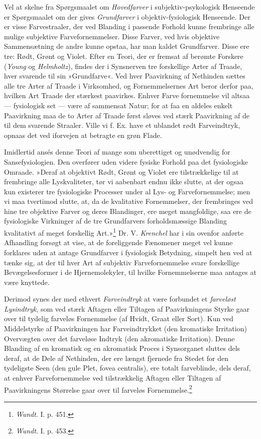 \documentclass[12pt,a4paper,openany]{book}
\newcommand{\opage}[1]{\marginnote{\footnotesize\textit{[#1]}}}
\begin{document}
Vel at skelne fra Spørgsmaalet om \emph{Hovedfarver} i
subjektiv-psykologisk Henseende er Spørgsmaalet om der gives
\emph{Grundfarver} i objektiv-fysiologisk Henseende. Der er visse
Farvestraaler, der ved Blanding i passende Forhold kunne frembringe alle
mulige subjektive Farvefornemmelser. Disse Farver, ved hvis objektive
Sammensætning de andre kunne opstaa, har man kaldet Grundfarver. Disse
ere tre: Rødt, Grønt og Violet. Efter en Teori, der er fremsat af
berømte Forskere (\emph{Young} og \emph{Helmholtz}), findes der i
Synsnerven tre forskellige Arter af Traade, hver svarende til sin
»Grundfarve«. Ved hver Paavirkning af Nethinden sættes alle tre
\opage{124}Arter af Traade i Virksomhed, og Fornemmelsernes Art beror
derfor paa, hvilken Art Traade der stærkest paavirkes. Enhver Farve
fornemmelse vil altsaa --- fysiologisk set --- være af sammensat Natur;
for at faa en aldeles enkelt Paavirkning maa de to Arter af Traade først
sløves ved stærk Paavirkning af de til dem svarende Straaler. Ville vi
f. Ex. have et ublandet rødt Farveindtryk, opnaas det ved iforvejen at
betragte en grøn Flade.

Imidlertid ansés denne Teori af mange som uberettiget og unødvendig for
Sansefysiologien. Den overfører uden videre fysiske Forhold paa det
fysiologiske Omraade. »Deraf at objektivt Rødt, Grønt og Violet ere
tilstrækkelige til at frembringe alle Lyskvaliteter, tør vi aabenbart
endnu ikke slutte, at der ogsaa kun existerer tre fysiologiske Processer
under al Lys- og Farvefornemmelse; men vi maa tvertimod slutte, at, da
de kvalitative Fornemmelser, der frembringes ved hine tre objektive
Farver og deres Blandinger, ere meget mangfoldige, saa ere de
fysiologiske Virkninger af de tre Grundfarvers forholdsmæssige Blanding
kvalitativt af meget forskellig Art.»\footnote[1]{\emph{Wundt}. I. p.
451.} Dr. V. \emph{Krenchel} har i sin ovenfor anførte Afhandling
forsøgt at vise, at de foreliggende Fænomener meget vel kunne forklares
uden at antage Grundfarver i fysiologisk Betydning, simpelt hen ved at
tænke sig, at der til hver Art af subjektiv Farvefornemmelse svare
forskellige Bevægelsesformer i de Hjernemolekyler, til hvilke
Fornemmelserne maa antages at være knyttede.

Derimod synes der med ethvert \emph{Farveindtryk} at være forbundet et
\emph{farveløst Lysindtryk}, som ved stærk Aftagen eller Tiltagen af
Paavirkningens Styrke gaar over til tydelig farveløs Fornemmelse (af
Hvidt, Graat eller Sort). Kun ved Middelstyrke af Paavirkningen har
Farveindtrykket (den kromatiske Irritation) Overvægten over det
farveløse Indtryk (den akromatiske Irritation). Denne Blanding af en
kromatisk og en akromatisk Proces i Synsorganet sluttes dels deraf, at
de Dele af Nethinden, der ere længst fjernede fra Stedet for den
tydeligste Seen (den gule Plet, fovea centralis), ere totalt
farveblinde, dels deraf, at enhver Farvefornemmelse ved
\opage{125}tilstrækkelig Aftagen eller Tiltagen af Paavirkningens
Størrelse gaar over til farveløs Fornemmelse.\footnote[1]{\emph{Wundt}.
I. p. 453.}
\end{document}
